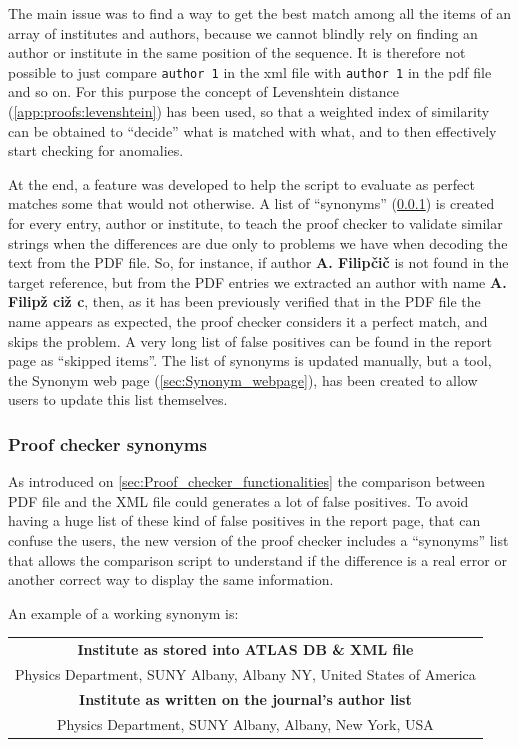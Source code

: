 The main issue was to find a way to get the best match among all the items of an array of institutes and authors,
because we cannot blindly rely on finding an author or institute in the same position of the sequence.
It is therefore not possible to just compare \texttt{author~1} in the xml file with \texttt{author~1} in the pdf file and so on.
For this purpose the concept of Levenshtein distance (\cref{app:proofs:levenshtein}) has been used,
so that a weighted index of similarity can be obtained to \enquote{decide} what is matched with what, and to then effectively start checking for anomalies.

At the end, a feature was developed to help the script to evaluate as perfect matches some that would not otherwise.
A list of \enquote{synonyms} (\cref{sec:Proof_checker_synonyms}) is created for every entry, author or institute,
to teach the proof checker to validate similar strings when the differences are due only to problems we have when decoding the text from the PDF file.
So, for instance, if author \textbf{A. Filipčič} is not found in the target reference,
but from the PDF entries we extracted an author with name \textbf{A. Filipž ciž c}, then,
as it has been previously verified that in the PDF file the name appears as expected, the proof checker considers it a perfect match, and skips the problem.
A very long list of false positives can be found in the report page as \enquote{skipped items}.
The list of synonyms is updated manually, but a tool, the Synonym web page (\cref{sec:Synonym_webpage}), has been created to allow users to update this list themselves.


\subsubsection{Proof checker synonyms}%
\label{sec:Proof_checker_synonyms}

As introduced on \cref{sec:Proof_checker_functionalities} the comparison between PDF file and the XML file could generates a lot of false positives.
To avoid having a huge list of these kind of false positives in the report page, that can confuse the users, the new version of the proof checker includes a \enquote{synonyms} list that allows the comparison script to understand if the difference is a real error or another correct way to display the same information.

An example of a working synonym is:
\begin{table}[htb]
  \centering
  \begin{tabular}{c}
  \textbf{Institute as stored into ATLAS DB \& XML file} \\
  Physics Department, SUNY Albany, Albany NY, United States of America \\
  \midrule
  \textbf{Institute as written on the journal's author list} \\
  Physics Department, SUNY Albany, Albany, New York, USA
  \end{tabular}
\end{table}

